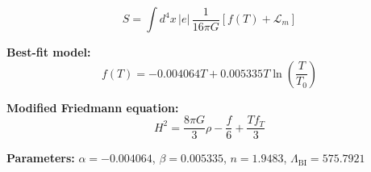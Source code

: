 
\begin{equation}
  S = \int d^4x \, |e| \, \frac{1}{16\pi G} \left[ f(T) + \mathcal{L}_m \right]
\end{equation}

\textbf{Best-fit model:}
\begin{equation}
  f(T) = -0.004064 T + 0.005335 T \ln\!\left(\frac{T}{T_0}\right)
\end{equation}

\textbf{Modified Friedmann equation:}
\begin{equation}
  H^2 = \frac{8\pi G}{3} \rho - \frac{f}{6} + \frac{T f_T}{3}
\end{equation}

\textbf{Parameters:}
$\alpha = -0.004064$, \quad
$\beta = 0.005335$, \quad
$n = 1.9483$, \quad
$\Lambda_{\text{BI}} = 575.7921$